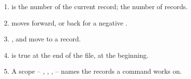 \begin{enumerate}
\item {} is the number of the current record;  the
  number of records.
\item {}  moves forward, or back for a negative .
\item {} ,  and  move to a record.
\item {} is true at the end of the file,  at the beginning.
\item A scope --  , ,  ,  --
  names the records a command works on.
\end{enumerate}
